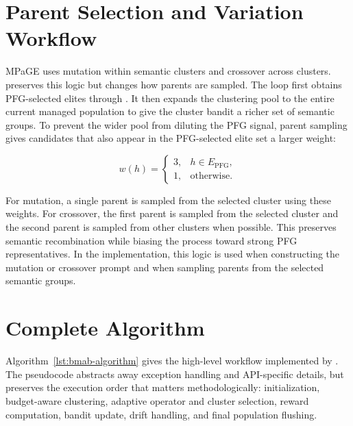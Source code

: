 \section{Parent Selection and Variation Workflow}

MPaGE uses mutation within semantic clusters and crossover across clusters. \bmab{} preserves this logic but changes how parents are sampled. The loop first obtains PFG-selected elites through . It then expands the clustering pool to the entire current managed population to give the cluster bandit a richer set of semantic groups. To prevent the wider pool from diluting the PFG signal, parent sampling gives candidates that also appear in the PFG-selected elite set a larger weight:

\begin{equation}
  w(h)=
  \begin{cases}
    3, & h \in E_{\mathrm{PFG}},\\
    1, & \text{otherwise}.
  \end{cases}
\end{equation}

For mutation, a single parent is sampled from the selected cluster using these weights. For crossover, the first parent is sampled from the selected cluster and the second parent is sampled from other clusters when possible. This preserves semantic recombination while biasing the process toward strong PFG representatives. In the implementation, this logic is used when constructing the mutation or crossover prompt and when sampling parents from the selected semantic groups.

\section{Complete Algorithm}

Algorithm~\ref{lst:bmab-algorithm} gives the high-level workflow implemented by . The pseudocode abstracts away exception handling and API-specific details, but preserves the execution order that matters methodologically: initialization, budget-aware clustering, adaptive operator and cluster selection, reward computation, bandit update, drift handling, and final population flushing.

